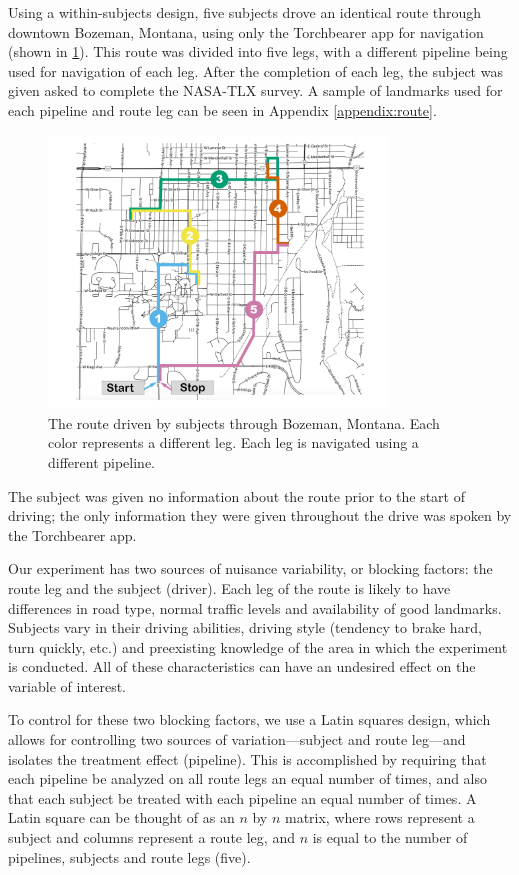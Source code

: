 Using a within-subjects design, five subjects drove an identical route through downtown Bozeman, Montana, using only the Torchbearer app for navigation (shown in \ref{fig:route}). This route was divided into five legs, with a different pipeline being used for navigation of each leg. After the completion of each leg, the subject was given asked to complete the NASA-TLX survey. A sample of landmarks used for each pipeline and route leg can be seen in Appendix \ref{appendix:route}.

\begin{figure}[htbp]
  \centering
  \includegraphics[width=0.8\textwidth]{images/route.pdf}
  \caption{The route driven by subjects through Bozeman, Montana. Each color represents a different leg. Each leg is navigated using a different pipeline.}
  \label{fig:route}
\end{figure}

The subject was given no information about the route prior to the start of driving; the only information they were given throughout the drive was spoken by the Torchbearer app. 

Our experiment has two sources of nuisance variability, or blocking factors: the route leg and the subject (driver). Each leg of the route is likely to have differences in road type, normal traffic levels and availability of good landmarks. Subjects vary in their driving abilities, driving style (tendency to brake hard, turn quickly, etc.) and preexisting knowledge of the area in which the experiment is conducted. All of these characteristics can have an undesired effect on the variable of interest. 

To control for these two blocking factors, we use a Latin squares design, which allows for controlling two sources of variation---subject and route leg---and isolates the treatment effect (pipeline). This is accomplished by requiring that each pipeline be analyzed on all route legs an equal number of times, and also that each subject be treated with each pipeline an equal number of times. A Latin square can be thought of as an $n$ by $n$ matrix, where rows represent a subject and columns represent a route leg, and $n$ is equal to the number of pipelines, subjects and route legs (five).

